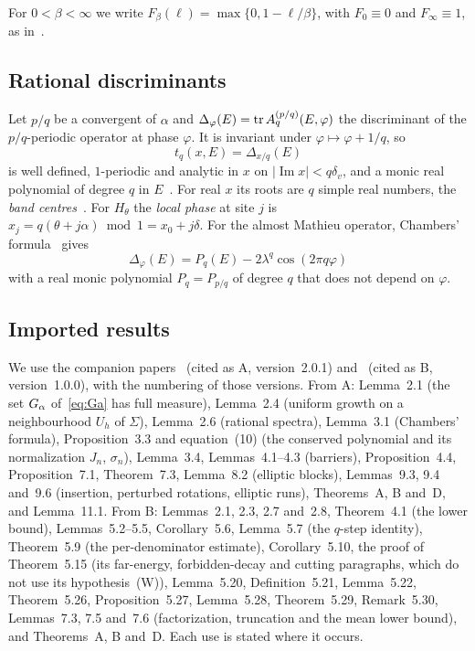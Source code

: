 For $0<\beta<\infty$ we write $F_\beta(\ell)=\max\{0,1-\ell/\beta\}$, with $F_0\equiv0$ and $F_\infty\equiv1$, as in~\cite{DMamo,DMuniv}.

\subsection{Rational discriminants}

Let $p/q$ be a convergent of $\alpha$ and $\Delta_\varphi(E)=\operatorname{tr} A^{(p/q)}_q(E,\varphi)$ the discriminant of the $p/q$-periodic operator at phase $\varphi$. It is invariant under $\varphi\mapsto\varphi+1/q$, so
\[
t_q(x,E)=\Delta_{x/q}(E)
\]
is well defined, $1$-periodic and analytic in $x$ on $|\operatorname{Im}x|<q\delta_v$, and a monic real polynomial of degree $q$ in $E$~\cite[Section~5.2]{DMuniv}. For real $x$ its roots are $q$ simple real numbers, the \emph{band centres}~\cite[Lemma~5.3]{DMuniv}. For $H_\theta$ the \emph{local phase} at site $j$ is $x_j=q(\theta+j\alpha)\bmod1=x_0+j\delta$. For the almost Mathieu operator, Chambers' formula~\cite[Lemma~3.1]{DMamo} gives
\begin{equation}\label{eq:chambers}
\Delta_\varphi(E)=P_q(E)-2\lambda^q\cos(2\pi q\varphi)
\end{equation}
with a real monic polynomial $P_q=P_{p/q}$ of degree $q$ that does not depend on $\varphi$.

\subsection{Imported results}

We use the companion papers~\cite{DMamo} (cited as A, version~2.0.1) and~\cite{DMuniv} (cited as B, version~1.0.0), with the numbering of those versions. From A: Lemma~2.1 (the set $G_\alpha$ of~\eqref{eq:Ga} has full measure), Lemma~2.4 (uniform growth on a neighbourhood $U_h$ of $\Sigma$), Lemma~2.6 (rational spectra), Lemma~3.1 (Chambers' formula), Proposition~3.3 and equation~(10) (the conserved polynomial and its normalization $J_n$, $\sigma_n$), Lemma~3.4, Lemmas~4.1--4.3 (barriers), Proposition~4.4, Proposition~7.1, Theorem~7.3, Lemma~8.2 (elliptic blocks), Lemmas~9.3, 9.4 and~9.6 (insertion, perturbed rotations, elliptic runs), Theorems~A, B and~D, and Lemma~11.1. From B: Lemmas~2.1, 2.3, 2.7 and~2.8, Theorem~4.1 (the lower bound), Lemmas~5.2--5.5, Corollary~5.6, Lemma~5.7 (the $q$-step identity), Theorem~5.9 (the per-denominator estimate), Corollary~5.10, the proof of Theorem~5.15 (its far-energy, forbidden-decay and cutting paragraphs, which do not use its hypothesis~(W)), Lemma~5.20, Definition~5.21, Lemma~5.22, Theorem~5.26, Proposition~5.27, Lemma~5.28, Theorem~5.29, Remark~5.30, Lemmas~7.3, 7.5 and~7.6 (factorization, truncation and the mean lower bound), and Theorems~A, B and~D. Each use is stated where it occurs.

